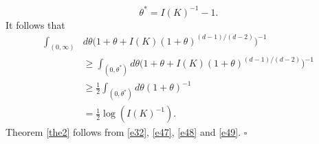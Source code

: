 \documentclass[a4paper,9pt]{article}
\begin{document}
\begin{equation}\label{e48}
\theta^*=I(K)^{-1}-1.
\end{equation}
It follows that
\begin{align}\label{e49}
\int_{(0,\infty)}&d\theta \Big(1+\theta+I(K)(1+\theta)^{(d-1)/(d-2)}\Big)^{-1}\nonumber\\&\ge \int_{(0,\theta^*)}d\theta \Big(1+\theta+I(K)(1+\theta)^{(d-1)/(d-2)}\Big)^{-1}\nonumber\\&
\ge \frac12\int_{(0,\theta^*)}d\theta (1+\theta)^{-1}\nonumber\\&
=\frac{1}{2}\log (I(K)^{-1}).
\end{align}
Theorem \ref{the2} follows from \eqref{e32}, \eqref{e47}, \eqref{e48} and \eqref{e49}.
\hspace*{\fill }$\square $
\end{document}
